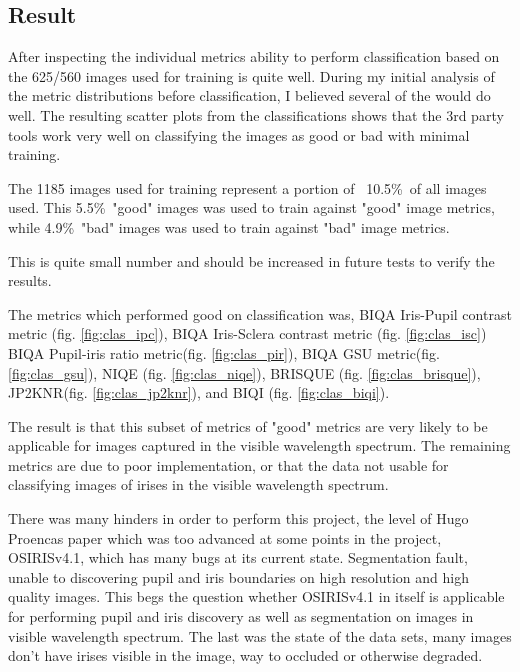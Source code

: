 \subsection{Result}
\label{sec:res}
After inspecting the individual metrics ability to perform classification based
on the 625/560 images used for training is quite well.  During my initial
analysis of the metric distributions before classification, I believed several
of the would do well.  The resulting scatter plots from the classifications
shows that the 3rd party tools work very well on classifying the images as good
or bad with minimal training.

The 1185 images used for training represent a portion of ~10.5\%\ of all images
used. This 5.5\%\ "good" images was used to train against "good" image metrics,
while 4.9\%\ "bad" images was used to train against "bad" image metrics.

This is quite small number and should be increased in future tests to verify the
results.

The metrics which performed good on classification was, BIQA Iris-Pupil contrast
metric (fig. \ref{fig:clas_ipc}), BIQA Iris-Sclera contrast metric (fig.
\ref{fig:clas_isc}) BIQA Pupil-iris ratio metric(fig. \ref{fig:clas_pir}), BIQA
GSU metric(fig. \ref{fig:clas_gsu}), NIQE\cite{niqe} (fig. \ref{fig:clas_niqe}),
BRISQUE\cite{brisque} (fig. \ref{fig:clas_brisque}), JP2KNR\cite{jp2knr}(fig.
\ref{fig:clas_jp2knr}), and BIQI\cite{biqi} (fig. \ref{fig:clas_biqi}).

The result is that this subset of metrics of "good" metrics are very likely to
be applicable for images captured in the visible wavelength spectrum.  The
remaining metrics are due to poor implementation, or that the data not usable
for classifying images of irises in the visible wavelength spectrum.

There was many hinders in order to perform this project, the level of Hugo
Proencas paper\cite{hugo} which was too advanced at some points in the project,
OSIRISv4.1\cite{osiris}, which has many bugs at its current state.  Segmentation
fault, unable to discovering pupil and iris boundaries on high resolution and
high quality images.  This begs the question whether OSIRISv4.1 in itself is
applicable for performing pupil and iris discovery as well as segmentation on
images in visible wavelength spectrum.  The last was the state of the data sets,
many images don't have irises visible in the image, way to occluded or otherwise
degraded.



